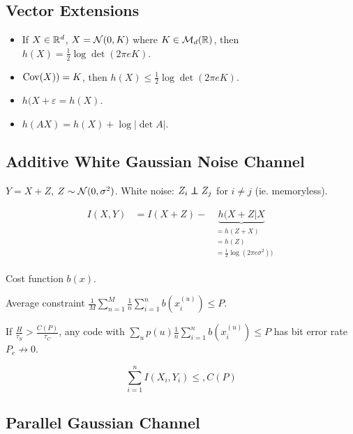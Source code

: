 \subsection{Vector Extensions}
\begin{itemize}
    \item If $X \in \mathbb{R}^d$, $X=\mathcal{N}(0, K)$ where $K \in \mathcal{M}_d(\mathbb{R})$, then $h(X) = \frac{1}{2}\log \det(2\pi e K)$.
    \item $\operatorname{Cov}(X)) = K$, then $h(X) \leqslant \frac{1}{2} \log \det (2\pi e K)$.
    \item $h(X+\varepsilon = h(X)$.
    \item $h(AX) = h(X) + \log \lvert\det A \rvert$.
\end{itemize}

\subsection{Additive White Gaussian Noise Channel}

$Y = X + Z$, $Z\sim \mathcal{N}(0,\sigma^2)$. White noise: $Z_i \perp\hspace{-7pt}\perp Z_j$ for $i\neq j$ (ie. memoryless).

\[
    \begin{aligned}
        I(X,Y) &= I(X+Z) - \underbrace{h(X+Z \vert X}_{\scriptscriptstyle\begin{aligned}
                &= h(Z + X)\\&=h(Z)\\&=\frac{1}{2}\log(2\pi e \sigma^2))
        \end{aligned}}
    \end{aligned}
\]

Cost function $b(x)$.

Average constraint $\frac{1}{M} \sum\limits_{n=1}^{M} \frac{1}{n} \sum\limits_{i=1}^n b(x_i^{(u)}) \leqslant P$.

\begin{theorem}
    If $\frac{H}{\tau_S} > \frac{C(P)}{\tau_C}$, any code  with $\sum\limits_u p(u) \frac{1}{n} \sum\limits_{i=1}^nb(x^{(u)}_i) \leqslant P$ has bit error rate $P_e \not\to 0$.
\end{theorem}

\begin{lemma}
    \[
        \sum\limits_{i=1}^n I(X_i, Y_i) \leqslant , C(P)
    \]
\end{lemma}

\subsection{Parallel Gaussian Channel}

